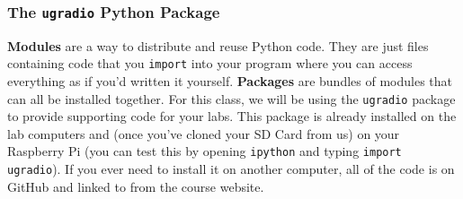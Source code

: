 \documentclass[11pt,preprint]{aastex}
\begin{document}
%
%
%
%
%
\subsubsection{The {\tt ugradio} Python Package}

\noindent
{\bf Modules} are a way to distribute and reuse Python code.  They are 
just files containing code that you {\tt import} into your program where you can
access everything as if you'd written it yourself.  {\bf Packages} are bundles
of modules that can all be installed together.  For this class, we will be using
the {\tt ugradio} package to provide supporting code for your labs.  This package
is already installed on the lab computers and (once you've cloned your SD Card from
us) on your Raspberry Pi (you can test this by opening {\tt ipython}
and typing {\tt import ugradio}).  If you ever need to install it on another computer,
all of the code is on GitHub and linked to from the course website.  
\end{document}
